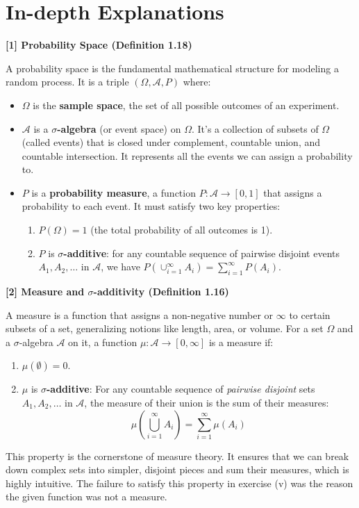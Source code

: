 \documentclass[11pt,a4paper]{article}
\begin{document}
\newpage
\section*{In-depth Explanations}

\hypertarget{note1}{\textbf{[1] Probability Space (Definition 1.18)}}
A probability space is the fundamental mathematical structure for modeling a random process. It is a triple $(\Omega, \mathcal{A}, P)$ where:
\begin{itemize}
    \item $\Omega$ is the \textbf{sample space}, the set of all possible outcomes of an experiment.
    \item $\mathcal{A}$ is a \textbf{$\sigma$-algebra} (or event space) on $\Omega$. It's a collection of subsets of $\Omega$ (called events) that is closed under complement, countable union, and countable intersection. It represents all the events we can assign a probability to.
    \item $P$ is a \textbf{probability measure}, a function $P: \mathcal{A} \to [0,1]$ that assigns a probability to each event. It must satisfy two key properties:
    \begin{enumerate}
        \item $P(\Omega)=1$ (the total probability of all outcomes is 1).
        \item $P$ is \textbf{$\sigma$-additive}: for any countable sequence of pairwise disjoint events $A_1, A_2, \dots$ in $\mathcal{A}$, we have $P(\cup_{i=1}^\infty A_i) = \sum_{i=1}^\infty P(A_i)$.
    \end{enumerate}
\end{itemize}
\vspace{1cm}

\hypertarget{note2}{\textbf{[2] Measure and $\sigma$-additivity (Definition 1.16)}}
A measure is a function that assigns a non-negative number or $\infty$ to certain subsets of a set, generalizing notions like length, area, or volume. For a set $\Omega$ and a $\sigma$-algebra $\mathcal{A}$ on it, a function $\mu: \mathcal{A} \to [0, \infty]$ is a measure if:
\begin{enumerate}
    \item $\mu(\emptyset)=0$.
    \item $\mu$ is \textbf{$\sigma$-additive}: For any countable sequence of \emph{pairwise disjoint} sets $A_1, A_2, \dots$ in $\mathcal{A}$, the measure of their union is the sum of their measures:
    \[ \mu\left(\bigcup_{i=1}^{\infty} A_i\right) = \sum_{i=1}^{\infty} \mu(A_i) \]
\end{enumerate}
This property is the cornerstone of measure theory. It ensures that we can break down complex sets into simpler, disjoint pieces and sum their measures, which is highly intuitive. The failure to satisfy this property in exercise (v) was the reason the given function was not a measure.
\vspace{1cm}
\end{document}
